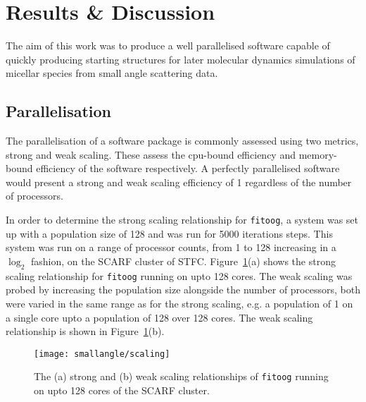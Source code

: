 \section{Results \& Discussion}
The aim of this work was to produce a well parallelised software capable of quickly producing starting structures for later molecular dynamics simulations of micellar species from small angle scattering data.

\subsection{Parallelisation}
The parallelisation of a software package is commonly assessed using two metrics, strong and weak scaling.
These assess the cpu-bound efficiency and memory-bound efficiency of the software respectively.
A perfectly parallelised software would present a strong and weak scaling efficiency of 1 regardless of the number of processors.

In order to determine the strong scaling relationship for \texttt{fitoog}, a system was set up with a population size of 128 and was run for 5000 iterations steps.
This system was run on a range of processor counts, from 1 to 128 increasing in a $\log_2$ fashion, on the SCARF cluster of STFC.
Figure~\ref{fig:scale}(a) shows the strong scaling relationship for \texttt{fitoog} running on upto 128 cores.
The weak scaling was probed by increasing the population size alongside the number of processors, both were varied in the same range as for the strong scaling, e.g. a population of 1 on a single core upto a population of 128 over 128 cores.
The weak scaling relationship is shown in Figure~\ref{fig:scale}(b).
%
\begin{figure}
    \centering
    \texttt{[image: smallangle/scaling]}
    \caption{The (a) strong and (b) weak scaling relationships of \texttt{fitoog} running on upto 128 cores of the SCARF cluster.}
    \label{fig:scale}
\end{figure}
%

